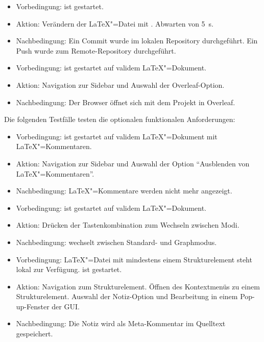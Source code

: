 \begin{itemize}
  \item Vorbedingung: \texla{} ist gestartet.
  \item Aktion: Verändern der \LaTeX"=Datei mit \texla{}.
  Abwarten von 5~\si{\second}.
  \item Nachbedingung: Ein Commit wurde im lokalen Repository durchgeführt.
  Ein Push wurde zum Remote-Repository durchgeführt.
\end{itemize}

\begin{itemize}
  \item Vorbedingung: \texla{} ist gestartet auf validem \LaTeX"=Dokument.
  \item Aktion: Navigation zur Sidebar und Auswahl der Overleaf-Option.
  \item Nachbedingung: Der Browser öffnet sich mit dem Projekt in Overleaf.
\end{itemize}

Die folgenden Testfälle testen die optionalen funktionalen Anforderungen:

\begin{itemize}
  \item Vorbedingung: \texla{} ist gestartet auf validem \LaTeX"=Dokument mit \LaTeX"=Kommentaren.
  \item Aktion: Navigation zur Sidebar und Auswahl der Option \enquote{Ausblenden von \LaTeX"=Kommentaren}.
  \item Nachbedingung: \LaTeX"=Kommentare werden nicht mehr angezeigt.
\end{itemize}

\begin{itemize}
  \item Vorbedingung: \texla{} ist gestartet auf validem \LaTeX"=Dokument.
  \item Aktion: Drücken der Tastenkombination zum Wechseln zwischen Modi.
  \item Nachbedingung: \texla{} wechselt zwischen Standard- und Graphmodus.
\end{itemize}

\begin{itemize}
  \item Vorbedingung: \LaTeX"=Datei mit mindestens einem Strukturelement steht lokal zur Verfügung.
  \texla{} ist gestartet.
  \item Aktion: Navigation zum Strukturelement.
  Öffnen des Kontextmenüs zu einem Strukturelement.
  Auswahl der Notiz-Option und Bearbeitung in einem Pop-up-Fenster der GUI.
  \item Nachbedingung: Die Notiz wird als Meta-Kommentar im Quelltext gespeichert.
\end{itemize}

